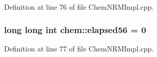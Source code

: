 Definition at line 76 of file Chem\-N\-R\-M\-Impl.\-cpp.

\hypertarget{namespacechem_a06af82e2b66ef7327fc568000f4a7279}{
\subsubsection[{elapsed56}]{\setlength{\rightskip}{0pt plus 5cm}long long int {\bf chem\-::elapsed56} = 0}}\label{namespacechem_a06af82e2b66ef7327fc568000f4a7279}


Definition at line 77 of file Chem\-N\-R\-M\-Impl.\-cpp.


